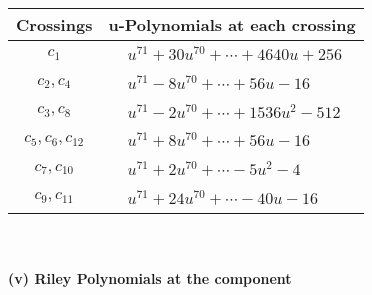 \documentclass[1p]{elsarticle_modified}
\theoremstyle{definition}
\begin{document}
\begin{tabular}{m{50pt}|m{274pt}}
Crossings & \hspace{64pt}u-Polynomials at each crossing \\
\hline $$\begin{aligned}c_{1}\end{aligned}$$&$\begin{aligned}
&u^{71}+30 u^{70}+\cdots+4640 u+256
\end{aligned}$\\
\hline $$\begin{aligned}c_{2},c_{4}\end{aligned}$$&$\begin{aligned}
&u^{71}-8 u^{70}+\cdots+56 u-16
\end{aligned}$\\
\hline $$\begin{aligned}c_{3},c_{8}\end{aligned}$$&$\begin{aligned}
&u^{71}-2 u^{70}+\cdots+1536 u^2-512
\end{aligned}$\\
\hline $$\begin{aligned}c_{5},c_{6},c_{12}\end{aligned}$$&$\begin{aligned}
&u^{71}+8 u^{70}+\cdots+56 u-16
\end{aligned}$\\
\hline $$\begin{aligned}c_{7},c_{10}\end{aligned}$$&$\begin{aligned}
&u^{71}+2 u^{70}+\cdots-5 u^2-4
\end{aligned}$\\
\hline $$\begin{aligned}c_{9},c_{11}\end{aligned}$$&$\begin{aligned}
&u^{71}+24 u^{70}+\cdots-40 u-16
\end{aligned}$\\
\hline
\end{tabular}\\~\\
\newpage\renewcommand{\arraystretch}{1}
\flushleft \textbf{(v) Riley Polynomials at the component}\newline \\
\end{document}
